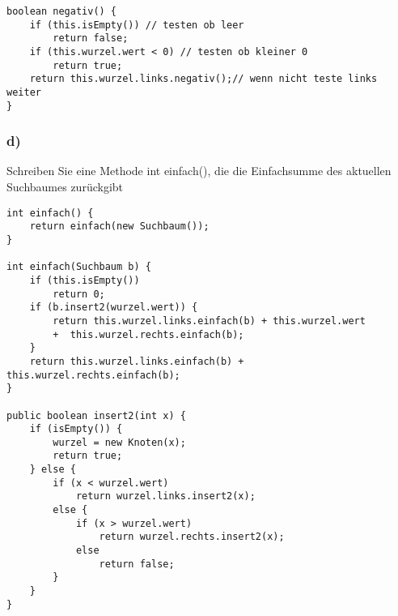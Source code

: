 \documentclass[a4paper, 10pt]{article}
\begin{document}
\begin{lstlisting}
boolean negativ() {
    if (this.isEmpty()) // testen ob leer
        return false;   
    if (this.wurzel.wert < 0) // testen ob kleiner 0
        return true;
    return this.wurzel.links.negativ();// wenn nicht teste links weiter
}
\end{lstlisting}

\subsubsection*{d)}
Schreiben Sie eine Methode int einfach(), die die Einfachsumme des aktuellen
Suchbaumes zurückgibt\\

\begin{lstlisting}
int einfach() {
    return einfach(new Suchbaum());
}

int einfach(Suchbaum b) {
    if (this.isEmpty()) 
        return 0;
    if (b.insert2(wurzel.wert)) {
        return this.wurzel.links.einfach(b) + this.wurzel.wert 
        +  this.wurzel.rechts.einfach(b);
    }
    return this.wurzel.links.einfach(b) + this.wurzel.rechts.einfach(b);
}

public boolean insert2(int x) {
    if (isEmpty()) {
        wurzel = new Knoten(x);
        return true;
    } else {
        if (x < wurzel.wert)
            return wurzel.links.insert2(x);
        else {
            if (x > wurzel.wert)
                return wurzel.rechts.insert2(x);
            else 
                return false;
        }
    }
}
\end{lstlisting}
\end{document}
